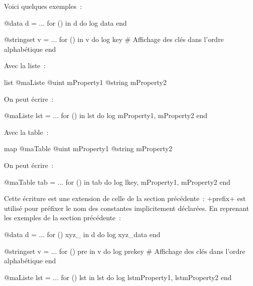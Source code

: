 Voici quelques exemples~:
\begin{galgas}
@data d = ...
for () in d do
  log data
end
\end{galgas}



\begin{galgas}
@stringset v = ...
for () in v do
  log key # Affichage des clés dans l'ordre alphabétique
end
\end{galgas}

Avec la liste~:
\begin{galgas}
list @maListe {
  @uint mProperty1
  @string mProperty2
}
\end{galgas}

On peut écrire~:

\begin{galgas}
@maListe lst = ...
for () in lst do
  log mProperty1, mProperty2
end
\end{galgas}


Avec la table~:
\begin{galgas}
map @maTable {
  @uint mProperty1
  @string mProperty2
}
\end{galgas}

On peut écrire~:

\begin{galgas}
@maTable tab = ...
for () in tab do
  log lkey, mProperty1, mProperty2
end
\end{galgas}



Cette écriture est une extension de celle de la section précédente~: \ggs+prefix+ est utilisé pour préfixer le nom des constantes implicitement déclarées. En reprenant les exemples de la section précédente~:

\begin{galgas}
@data d = ...
for () xyz_ in d do
  log xyz_data
end
\end{galgas}



\begin{galgas}
@stringset v = ...
for () pre in v do
  log prekey # Affichage des clés dans l'ordre alphabétique
end
\end{galgas}


\begin{galgas}
@maListe lst = ...
for () lst in lst do
  log lstmProperty1, lstmProperty2
end
\end{galgas}


